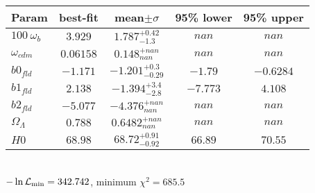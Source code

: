 \begin{tabular}{|l|c|c|c|c|} 
 \hline 
Param & best-fit & mean$\pm\sigma$ & 95\% lower & 95\% upper \\ \hline 
$100~\omega_{b }$ &$3.929$ & $1.787_{-1.3}^{+0.42}$ & $nan$ & $nan$ \\ 
$\omega_{cdm }$ &$0.06158$ & $0.148_{nan}^{+nan}$ & $nan$ & $nan$ \\ 
$b0_{fld }$ &$-1.171$ & $-1.201_{-0.29}^{+0.3}$ & $-1.79$ & $-0.6284$ \\ 
$b1_{fld }$ &$2.138$ & $-1.394_{-2.8}^{+3.4}$ & $-7.773$ & $4.108$ \\ 
$b2_{fld }$ &$-5.077$ & $-4.376_{nan}^{+nan}$ & $nan$ & $nan$ \\ 
$\Omega_{\Lambda }$ &$0.788$ & $0.6482_{nan}^{+nan}$ & $nan$ & $nan$ \\ 
$H0$ &$68.98$ & $68.72_{-0.92}^{+0.91}$ & $66.89$ & $70.55$ \\ 
\hline 
 \end{tabular} \\ 
$-\ln{\cal L}_\mathrm{min} =342.742$, minimum $\chi^2=685.5$ \\ 
